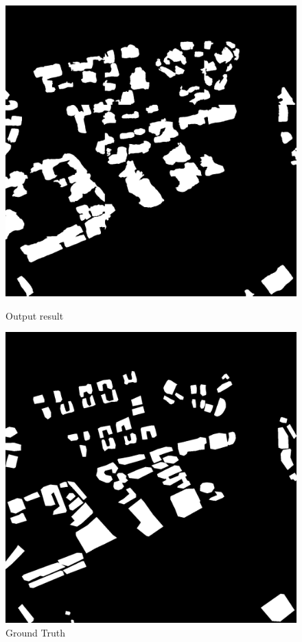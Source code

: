\documentclass[]{IEEEtran}
\begin{document}
\begin{figure}
	\vspace{0.5cm}
		\centering
		\includegraphics[width=0.7\columnwidth]{fw}
		\caption{Output result}
		\label{fig:fw}
	\vspace{0.3cm}
		\centering
		\includegraphics[width=0.7\columnwidth]{rt}
		\caption{Ground Truth}
		\label{fig:rt}
\end{figure}





\end{document}
